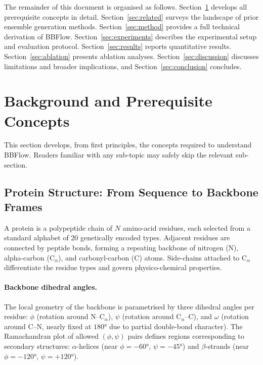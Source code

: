 \documentclass[12pt,a4paper]{article}
\begin{document}
The remainder of this document is organised as follows.  Section~\ref{sec:background}
develops all prerequisite concepts in detail.  Section~\ref{sec:related} surveys the landscape
of prior ensemble generation methods.  Section~\ref{sec:method} provides a full technical
derivation of BBFlow.  Section~\ref{sec:experiments} describes the experimental setup and
evaluation protocol.  Section~\ref{sec:results} reports quantitative results.  Section~\ref{sec:ablation}
presents ablation analyses.  Section~\ref{sec:discussion} discusses limitations and broader
implications, and Section~\ref{sec:conclusion} concludes.

\section{Background and Prerequisite Concepts}
\label{sec:background}

This section develops, from first principles, the concepts required to understand BBFlow.
Readers familiar with any sub-topic may safely skip the relevant sub-section.

\subsection{Protein Structure: From Sequence to Backbone Frames}
\label{sec:proteins}

A protein is a polypeptide chain of $N$ amino-acid residues, each selected from a standard
alphabet of 20 genetically encoded types.  Adjacent residues are connected by peptide bonds,
forming a repeating backbone of nitrogen (N), alpha-carbon (C$_\alpha$), and carbonyl-carbon
(C) atoms.  Side-chains attached to C$_\alpha$ differentiate the residue types and govern
physico-chemical properties.

\paragraph{Backbone dihedral angles.}
The local geometry of the backbone is parametrised by three dihedral angles per residue:
$\phi$ (rotation around N--C$_\alpha$), $\psi$ (rotation around C$_\alpha$--C), and $\omega$
(rotation around C--N, nearly fixed at $180°$ due to partial double-bond character).
The Ramachandran plot of allowed $(\phi,\psi)$ pairs defines regions corresponding to
secondary structures: $\alpha$-helices (near $\phi=-60°$, $\psi=-45°$) and
$\beta$-strands (near $\phi=-120°$, $\psi=+120°$).
\end{document}
